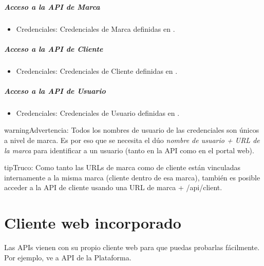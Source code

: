 \documentclass[letterpaper,10pt,spanish]{sphinxmanual}
\begin{document}
\paragraph{Acceso a la API de Marca}
\begin{itemize}
\item {} 
Credenciales: Credenciales de Marca definidas en {\hyperref[administration_portal/platform/brands:brand\string-operators]{}}.

\end{itemize}
\paragraph{Acceso a la API de Cliente}
\begin{itemize}
\item {} 
Credenciales: Credenciales de Cliente definidas en {\hyperref[administration_portal/brand/clients/operators:client\string-operators]{}}.

\end{itemize}
\paragraph{Acceso a la API de Usuario}
\begin{itemize}
\item {} 
Credenciales: Credenciales de Usuario definidas en {\hyperref[administration_portal/client/vpbx/users:users]{}}.

\end{itemize}

\begin{notice}{warning}{Advertencia:}
Todos los nombres de usuario de las credenciales son únicos a nivel de marca. Es por eso que se necesita el dúo \emph{nombre de usuario + URL de la marca} para identificar a un usuario (tanto en la API como en el portal web).
\end{notice}

\begin{notice}{tip}{Truco:}
Como tanto las URLs de marca como de cliente están vinculadas internamente a la misma marca (cliente dentro de esa marca), también es posible acceder a la API de cliente usando una URL de marca + /api/client.
\end{notice}


\chapter{Cliente web incorporado}
\label{api_rest/web_client:built-in-web-client}\label{api_rest/web_client::doc}
Las APIs vienen con su propio cliente web para que puedas probarlas fácilmente. Por ejemplo, ve a API de la Plataforma.
\end{document}
